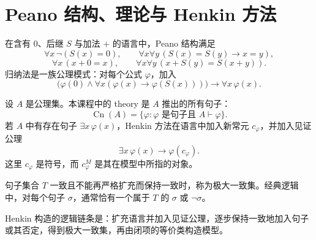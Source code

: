\section{Peano 结构、理论与 Henkin 方法}\label{sec:henkin}

在含有 $0$、后继 $S$ 与加法 $+$ 的语言中，Peano 结构满足
\[
\forall x\,\neg(S(x)=0),
\qquad
\forall x\forall y\,(S(x)=S(y)\to x=y),
\]
\[
\forall x\,(x+0=x),
\qquad
\forall x\forall y\,(x+S(y)=S(x+y)).
\]
归纳法是一族公理模式：对每个公式 $\varphi$，加入
\[
\bigl(\varphi(0)\land\forall x(\varphi(x)\to\varphi(S(x)))\bigr)\to\forall x\,\varphi(x).
\]

设 $A$ 是公理集。本课程中的 theory 是 $A$ 推出的所有句子：
\[
\operatorname{Cn}(A)=\{\varphi:\varphi\text{ 是句子且 }A\vdash\varphi\}.
\]
若 $A$ 中有存在句子 $\exists x\,\varphi(x)$，Henkin 方法在语言中加入新常元 $c_\varphi$，并加入见证公理
\[
\exists x\,\varphi(x)\to\varphi(c_\varphi).
\]
这里 $c_\varphi$ 是符号，而 $c_\varphi^M$ 是其在模型中所指的对象。

\begin{definition}[极大一致集]
句子集合 $T$ 一致且不能再严格扩充而保持一致时，称为极大一致集。经典逻辑中，对每个句子 $\sigma$，通常恰有一个属于 $T$ 的 $\sigma$ 或 $\neg\sigma$。
\end{definition}

Henkin 构造的逻辑链条是：扩充语言并加入见证公理，逐步保持一致地加入句子或其否定，得到极大一致集，再由闭项的等价类构造模型。
